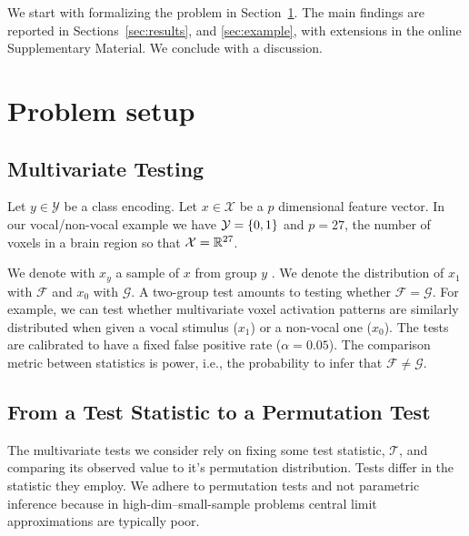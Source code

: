 \documentclass[]{bio}
\begin{document}
We start with formalizing the problem in Section~\ref{sec:problem_setup}.
The main findings are reported in Sections~\ref{sec:results}, and \ref{sec:example}, with extensions in the online Supplementary Material. 
We conclude with a discussion.







\section{Problem setup}
\label{sec:problem_setup}


\subsection{Multivariate Testing}

Let $y \in \mathcal{Y}$ be a class encoding. 
Let $x \in \mathcal{X}$ be a $p$ dimensional feature vector. 
In our vocal/non-vocal example we have $\mathcal{Y}=\{ 0,1 \}$ and $p=27$, the number of voxels in a brain region so that $\mathcal{X}=\mathbb{R}^{27}$. 

We denote with $x_y$ a sample of $x$ from group $y$ .
We denote the distribution of $x_1$ with $\mathcal{F}$ and $x_0$ with $\mathcal{G}$.
A two-group test amounts to testing whether $\mathcal{F}=\mathcal{G}$.
For example, we can test whether multivariate voxel activation patterns are similarly distributed when given a vocal stimulus ($x_1$) or a non-vocal one ($x_0$).
The tests are calibrated to have a fixed false positive rate ($\alpha=0.05$).
The comparison metric between statistics is power, i.e., the probability to infer that $\mathcal{F}\neq\mathcal{G}$.


\subsection{From a Test Statistic to a Permutation Test}

The multivariate tests we consider rely on fixing some test statistic, $\mathcal{T}$, and comparing its observed value to it's permutation distribution. 
Tests differ in the statistic they employ.
We adhere to permutation tests and not parametric inference because in high-dim--small-sample problems central limit approximations are typically poor.
\end{document}
